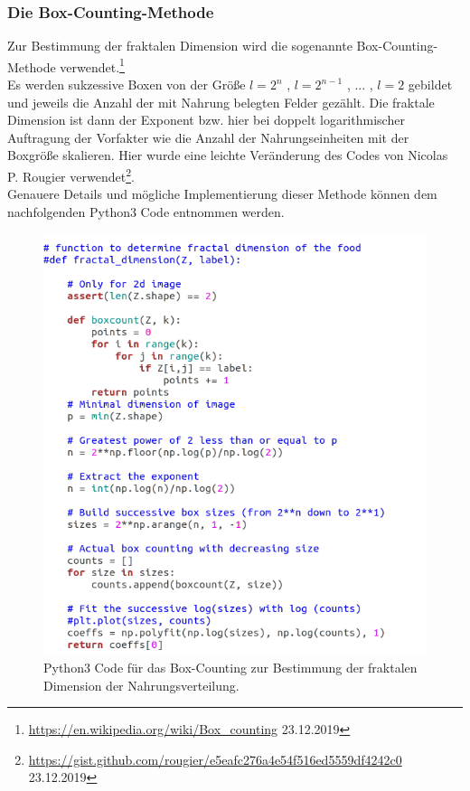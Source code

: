 \documentclass[a4paper, 12pt]{scrartcl}
\begin{document}
\subsubsection{Die Box-Counting-Methode}
Zur Bestimmung der fraktalen Dimension wird die sogenannte Box-Counting-Methode verwendet.\footnote[1]{\url{https://en.wikipedia.org/wiki/Box\_counting} 23.12.2019} 
\\
\noindent Es werden sukzessive Boxen von der Größe $l=2^n$ , $l=2^{n-1}$ , ... , $l=2$ gebildet und jeweils die Anzahl der mit Nahrung belegten Felder gezählt. Die fraktale Dimension ist dann der Exponent bzw. hier bei doppelt logarithmischer Auftragung der Vorfakter wie die Anzahl der Nahrungseinheiten mit der Boxgröße skalieren. Hier wurde eine leichte Veränderung des Codes von Nicolas P. Rougier verwendet\footnote[2]{\url{https://gist.github.com/rougier/e5eafc276a4e54f516ed5559df4242c0} 23.12.2019}.
\\
Genauere Details und mögliche Implementierung dieser Methode können dem nachfolgenden Python3 Code entnommen werden.
\begin{figure}[h!]
	\centering
	\includegraphics[scale=0.8]{fractal.png}
	\caption{Python3 Code für das Box-Counting zur Bestimmung der fraktalen Dimension der Nahrungsverteilung.}
\end{figure}
\end{document}
